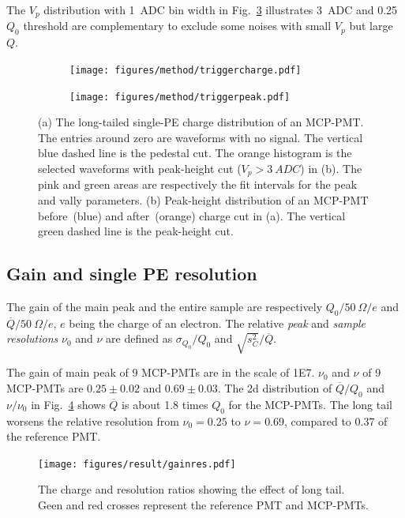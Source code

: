 The $V_p$ distribution with \SI{1}{ADC} bin width in Fig.~\ref{fig:triggerpeak} illustrates \SI{3}{ADC} and 0.25$Q_0$ threshold are complementary to exclude some noises with small $V_p$ but large $Q$.

\begin{figure}[!htbp]
    \centering
    \begin{subfigure}[b]{\SF\textwidth}
        \texttt{[image: figures/method/triggercharge.pdf]}
        \caption{}%
        \label{fig:triggercharge}
    \end{subfigure}
    \begin{subfigure}[b]{\SF\textwidth}
        \texttt{[image: figures/method/triggerpeak.pdf]}
        \caption{}%
        \label{fig:triggerpeak}
    \end{subfigure}
    \caption{(a) The long-tailed single-PE charge distribution of an MCP-PMT. The entries around zero are waveforms with no signal. The vertical blue dashed line is the pedestal cut. The orange histogram is the selected waveforms with peak-height cut ($V_p>\SI{3}{ADC}$) in (b). The pink and green areas are respectively the fit intervals for the peak and vally parameters. (b) Peak-height distribution of an MCP-PMT before~(blue) and after~(orange) charge cut in (a). The vertical green dashed line is the peak-height cut.}
\end{figure}

\subsection{Gain and single PE resolution}
\label{sec:noisegain}

The gain of the main peak and the entire sample are respectively ${Q_0}/{\SI{50}{\Omega}}/e$ and ${\overline{Q}}/{\SI{50}{\Omega}}/e$, $e$ being the charge of an electron. The relative \emph{peak} and \emph{sample resolutions} $\nu_0$ and $\nu$ are defined as ${\sigma_{Q_0}}/{Q_0}$ and ${\sqrt{s^2_{C}}}/{\overline{Q}}$.

The gain of main peak of 9 MCP-PMTs are in the scale of 1E7. $\nu_0$ and $\nu$ of 9 MCP-PMTs are $0.25\pm0.02$ and $0.69\pm0.03$. The 2d distribution of $\overline{Q}/{Q_0}$ and $\nu/{\nu_0}$ in Fig.~\ref{fig:totalchargeCompare} shows $\overline{Q}$ is about 1.8 times $Q_0$ for the MCP-PMTs. The long tail worsens the relative resolution from $\nu_0=0.25$ to $\nu=0.69$, compared to 0.37 of the reference PMT.

\begin{figure}[!htbp]
    \centering
    \texttt{[image: figures/result/gainres.pdf]}
    \caption{The charge and resolution ratios showing the effect of long tail. Geen and red crosses represent the reference PMT and MCP-PMTs.}
    \label{fig:totalchargeCompare}
\end{figure}

